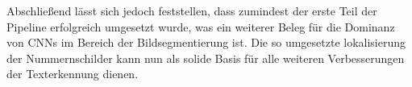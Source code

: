 Abschlie{\ss}end l\"asst sich jedoch feststellen, dass zumindest der erste Teil der
Pipeline erfolgreich umgesetzt wurde, was ein weiterer Beleg f\"ur die
Dominanz von CNNs im Bereich der Bildsegmentierung ist.
Die so umgesetzte lokalisierung der Nummernschilder kann nun als solide Basis f\"ur
alle weiteren Verbesserungen der Texterkennung dienen.
